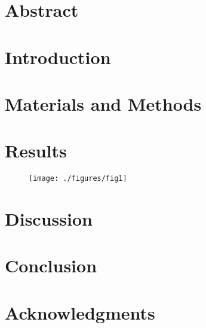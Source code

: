\documentclass[10pt,letterpaper]{article}
\begin{document}
\section*{Abstract}


% 

\linenumbers

\section*{Introduction}


\section*{Materials and Methods}


\section*{Results}

\begin{figure}[t]
  \centerline{\texttt{[image: ./figures/fig1]}}
    \caption{}\label{dalyFigureQuintiles}
\end{figure}







\section*{Discussion}


\section*{Conclusion}





\section*{Acknowledgments}

\nolinenumbers


\end{document}
